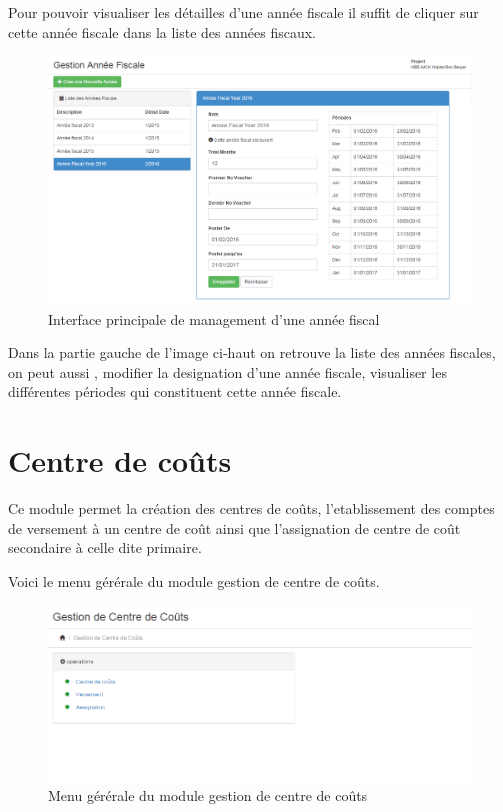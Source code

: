 \documentclass[12pt,a4paper]{report}
\begin{document}
\newpage
Pour pouvoir visualiser les détailles d'une année fiscale il suffit de cliquer sur cette année fiscale dans la liste des années fiscaux.

\begin{figure}[h]
\begin{center}
\includegraphics[width=12cm]{pic/FormAddFiscYear.png}
\end{center}
\caption{Interface principale de management d'une année fiscal}
\label{Interface principale de management d'une année fiscal}
\end{figure}

Dans la partie gauche de l'image ci-haut on retrouve la liste des années fiscales, on peut aussi , modifier la designation d'une année fiscale, visualiser les différentes périodes qui constituent cette année fiscale. 

\newpage
\section{Centre de coûts}
Ce module permet la création des centres de coûts, l'etablissement des comptes de versement à un centre de coût ainsi que l'assignation de centre de coût secondaire à celle dite primaire.

Voici le menu gérérale du module gestion de centre de coûts.

\begin{figure}[h]
\begin{center}
\includegraphics[width=14cm]{pic/GestCentreCout.png}
\end{center}
\caption{Menu gérérale du module gestion de centre de coûts}
\label{Menu gérérale du module gestion de centre de coûts}
\end{figure}
\end{document}
